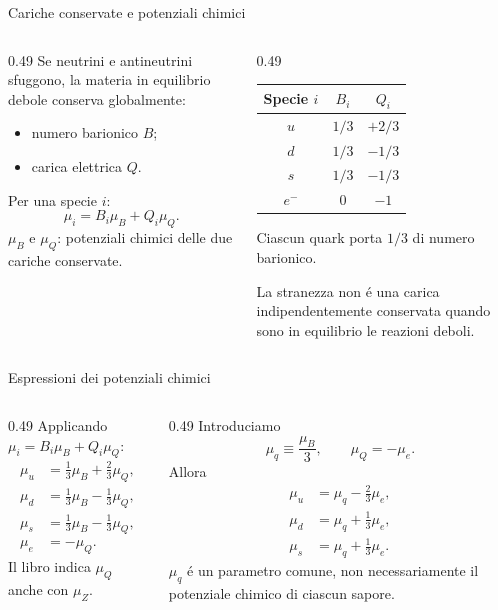 \begin{frame}[t]{Cariche conservate e potenziali chimici}
\small
\begin{columns}[T,onlytextwidth]
\begin{column}{0.49\textwidth}
Se neutrini e antineutrini sfuggono, la materia in equilibrio debole conserva globalmente:
\begin{itemize}
\item numero barionico $B$;
\item carica elettrica $Q$.
\end{itemize}
Per una specie $i$:
\[
\mu_i=B_i\mu_B+Q_i\mu_Q.
\]
$\mu_B$ e $\mu_Q$: potenziali chimici delle due cariche conservate.
\end{column}
\begin{column}{0.49\textwidth}
\centering
\begin{tabular}{c|cc}
Specie $i$ & $B_i$ & $Q_i$ \\ \hline
$u$ & $1/3$ & $+2/3$ \\
$d$ & $1/3$ & $-1/3$ \\
$s$ & $1/3$ & $-1/3$ \\
$e^-$ & $0$ & $-1$
\end{tabular}
\par\medskip
Ciascun quark porta $1/3$ di numero barionico.

La stranezza non \'e una carica indipendentemente conservata quando sono in equilibrio le reazioni deboli.
\end{column}
\end{columns}
\end{frame}

\begin{frame}[t]{Espressioni dei potenziali chimici}
\small
\begin{columns}[T,onlytextwidth]
\begin{column}{0.49\textwidth}
Applicando $\mu_i=B_i\mu_B+Q_i\mu_Q$:
\[
\begin{aligned}
\mu_u&=\tfrac13\mu_B+\tfrac23\mu_Q,\\
\mu_d&=\tfrac13\mu_B-\tfrac13\mu_Q,\\
\mu_s&=\tfrac13\mu_B-\tfrac13\mu_Q,\\
\mu_e&=-\mu_Q.
\end{aligned}
\]
Il libro indica $\mu_Q$ anche con $\mu_Z$.
\end{column}
\begin{column}{0.49\textwidth}
Introduciamo
\[
\mu_q\equiv\frac{\mu_B}{3},\qquad
\mu_Q=-\mu_e.
\]
Allora
\[
\begin{aligned}
\mu_u&=\mu_q-\tfrac23\mu_e,\\
\mu_d&=\mu_q+\tfrac13\mu_e,\\
\mu_s&=\mu_q+\tfrac13\mu_e.
\end{aligned}
\]
$\mu_q$ \'e un parametro comune, non necessariamente il potenziale chimico di ciascun sapore.
\end{column}
\end{columns}
\end{frame}

